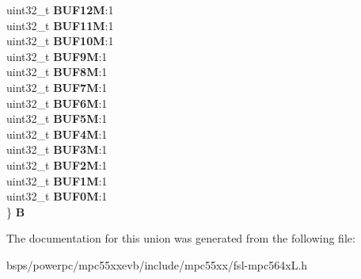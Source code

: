 \begin{DoxyCompactItemize}
\begin{tabbing}
\>uint32\_t {\bfseries BUF12M}:1\\
\>uint32\_t {\bfseries BUF11M}:1\\
\>uint32\_t {\bfseries BUF10M}:1\\
\>uint32\_t {\bfseries BUF9M}:1\\
\>uint32\_t {\bfseries BUF8M}:1\\
\>uint32\_t {\bfseries BUF7M}:1\\
\>uint32\_t {\bfseries BUF6M}:1\\
\>uint32\_t {\bfseries BUF5M}:1\\
\>uint32\_t {\bfseries BUF4M}:1\\
\>uint32\_t {\bfseries BUF3M}:1\\
\>uint32\_t {\bfseries BUF2M}:1\\
\>uint32\_t {\bfseries BUF1M}:1\\
\>uint32\_t {\bfseries BUF0M}:1\\
\} {\bfseries B}\\

\end{tabbing}\end{DoxyCompactItemize}


The documentation for this union was generated from the following file\+:\begin{DoxyCompactItemize}
\item 
bsps/powerpc/mpc55xxevb/include/mpc55xx/fsl-\/mpc564x\+L.\+h\end{DoxyCompactItemize}
